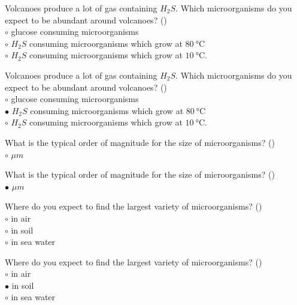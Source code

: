 \documentclass[]{beamer}
\begin{document}
\begin{frame}[shrink] {}
\addtocounter{questions}{1}
\color{blue}
Volcanoes produce a lot of gas containing $H_2S$. Which microorganisms do
you expect to be abundant around volcanoes? ()\\
\color{black}
\setlength{\parindent}{-0.4cm}
{\color{red}$\circ$} glucose consuming microorganisms\\
{\color{red}$\circ$} $H_2S$ consuming microorganisms which grow at $\SI{80}{\degreeCelsius}$\\
{\color{red}$\circ$} $H_2S$ consuming microorganisms which grow at $\SI{10}{\degreeCelsius}$.
\end{frame}
\begin{frame}[shrink] {}
\addtocounter{answers}{1}
\color{blue}
Volcanoes produce a lot of gas containing $H_2S$. Which microorganisms do
you expect to be abundant around volcanoes? ()\\
\color{black}
\setlength{\parindent}{-0.4cm}
{\color{red}$\circ$} glucose consuming microorganisms\\
{\color{red}$\bullet$} $H_2S$ consuming microorganisms which grow at $\SI{80}{\degreeCelsius}$\\
{\color{red}$\circ$} $H_2S$ consuming microorganisms which grow at $\SI{10}{\degreeCelsius}$.
\end{frame}
\begin{frame}[shrink] {}
\addtocounter{questions}{1}
\color{blue}
What is the typical order of magnitude for the size of microorganisms? ()\\
\color{black}
\setlength{\parindent}{-0.4cm}
{\color{red}$\circ$} ${\mu}m$
\end{frame}
\begin{frame}[shrink] {}
\addtocounter{answers}{1}
\color{blue}
What is the typical order of magnitude for the size of microorganisms? ()\\
\color{black}
\setlength{\parindent}{-0.4cm}
{\color{red}$\bullet$} ${\mu}m$
\end{frame}
\begin{frame}[shrink] {}
\addtocounter{questions}{1}
\color{blue}
Where do you expect to find the largest variety of microorganisms? ()\\
\color{black}
\setlength{\parindent}{-0.4cm}
{\color{red}$\circ$} in air\\
{\color{red}$\circ$} in soil\\
{\color{red}$\circ$} in sea water\\
\end{frame}
\begin{frame}[shrink] {}
\addtocounter{answers}{1}
\color{blue}
Where do you expect to find the largest variety of microorganisms? ()\\
\color{black}
\setlength{\parindent}{-0.4cm}
{\color{red}$\circ$} in air\\
{\color{red}$\bullet$} in soil\\
{\color{red}$\circ$} in sea water\\
\end{frame}
\end{document}

